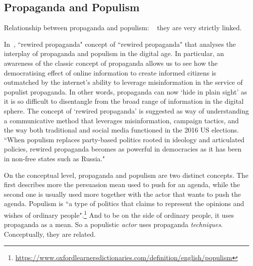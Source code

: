\subsection{Propaganda and Populism}
\label{sec:lit_related_populism}

Relationship between propaganda and populism:
~\cite{oates2021rewired,tumber2021routledge,pasquino2008populism}
they are very strictly linked.

In~\citet{oates2021rewired}, ``rewired propaganda"
concept of ``rewired propaganda" that analyses the interplay of propaganda and populism in the digital age. In particular, an awareness of the classic concept of propaganda allows us to see how the democratising effect of online information to create informed citizens is outmatched by the internet’s ability to leverage misinformation in the service of populist propaganda.
In other words, propaganda can now ‘hide in plain sight’ as it is so difficult to disentangle from the broad range of information in the digital sphere.
The concept of ‘rewired propaganda’ is suggested as way of understanding a communicative method that leverages misinformation, campaign tactics, and the way both traditional and social media functioned in the 2016 US elections.
``When populism replaces party-based politics rooted in ideology and articulated policies, rewired propaganda becomes as powerful in democracies as it has been in non-free states such as Russia."


On the conceptual level, propaganda and populism are two distinct concepts. The first describes more the persuasion mean used to push for an agenda, while the second one is usually used more together with the actor that wants to push the agenda. Populism is ``a type of politics that claims to represent the opinions and wishes of ordinary people".\footnote{\url{https://www.oxfordlearnersdictionaries.com/definition/english/populism}}
And to be on the side of ordinary people, it uses propaganda as a mean. So a populistic \emph{actor} uses propaganda \emph{techniques}. Conceptually, they are related.


